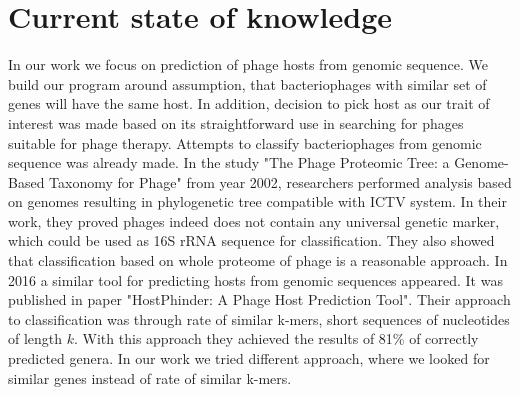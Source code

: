 
\section{Current state of knowledge}
In our work we focus on prediction of phage hosts from genomic sequence.
We build our program around assumption, that bacteriophages with similar set of genes will have the same host.
In addition, decision to pick host as our trait of interest was made based on its straightforward use in searching for phages suitable for phage therapy.
Attempts to classify bacteriophages from genomic sequence was already made.
In the study "The Phage Proteomic Tree: a Genome-Based Taxonomy for Phage"\cite{phage} from year 2002, researchers performed analysis based on genomes resulting in phylogenetic tree compatible with ICTV system.
In their work, they proved phages indeed does not contain any universal genetic marker, which could be used as 16S rRNA sequence for classification.
They also showed that classification based on whole proteome of phage is a reasonable approach.
In 2016 a similar tool for predicting hosts from genomic sequences appeared.
It was published in paper "HostPhinder: A Phage Host Prediction Tool"\cite{hostphinder}.
Their approach to classification was through rate of similar k-mers, short sequences of nucleotides of length $k$. 
With this approach they achieved the results of 81\% of correctly predicted genera.
In our work we tried different approach, where we looked for similar genes instead of rate of similar k-mers.  


